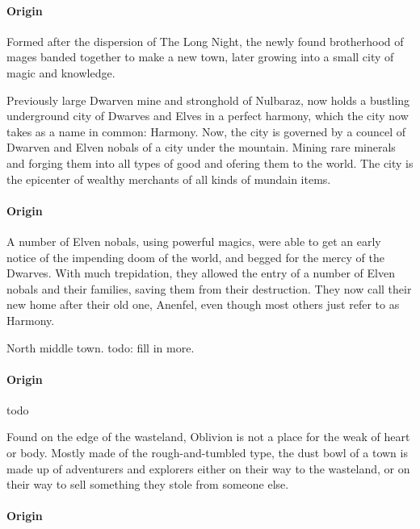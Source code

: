 \documentclass[letterpaper, twocolumn, openany, nodeprecatedcode, layout=true]{dndbook}
\begin{document}
\paragraph{Origin}

Formed after the dispersion of The Long Night, the newly found brotherhood of mages banded
together to make a new town, later growing into a small city of magic and knowledge.


Previously large Dwarven mine and stronghold of Nulbaraz, now holds a bustling underground
city of Dwarves and Elves in a perfect harmony, which the city now takes as a name in common:
Harmony. Now, the city is governed by a councel of Dwarven and Elven nobals of a city under
the mountain. Mining rare minerals and forging them into all types of good and ofering them
to the world. The city is the epicenter of wealthy merchants of all kinds of mundain items.

\paragraph{Origin}

A number of Elven nobals, using powerful magics, were able to get an early notice of the
impending doom of the world, and begged for the mercy of the Dwarves. With much trepidation,
they allowed the entry of a number of Elven nobals and their families, saving them from their
destruction. They now call their new home after their old one, Anenfel, even though most
others just refer to as Harmony.


North middle town. todo: fill in more.

\paragraph{Origin}

todo


Found on the edge of the wasteland, Oblivion is not a place for the weak of heart or body.
Mostly made of the rough-and-tumbled type, the dust bowl of a town is made up of adventurers
and explorers either on their way to the wasteland, or on their way to sell something they
stole from someone else.

\paragraph{Origin}
\end{document}
